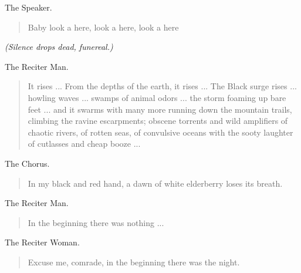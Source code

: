 \documentclass[letterpaper,article,12pt,oneside,notitlepage]{memoir}
\begin{document}
\begin{center}The Speaker.\end{center}

\begin{verse}
\hspace{1cm} Baby look a here, look a here, look a here \\
\end{verse}

\textit{(Silence drops dead, funereal.)}

\begin{center}The Reciter Man.\end{center}

\begin{verse}
\indent It rises ... From the depths of the earth, it rises ... The Black surge rises ... howling waves ... swamps of animal odors ... the storm foaming up bare feet ... and it swarms with many more running down the mountain trails, climbing the ravine escarpments; obscene torrents and wild amplifiers of chaotic rivers, of rotten seas, of convulsive oceans with the sooty laughter of cutlasses and cheap booze ... \\
\end{verse}

\begin{center}The Chorus.\end{center}

\begin{verse}
\hspace{1cm} In my black and red hand, a dawn of white elderberry loses its breath. \\
\end{verse}

\begin{center}The Reciter Man.\end{center}

\begin{verse}
\hspace{1cm} In the beginning there was nothing ... \\
\end{verse}

\begin{center}The Reciter Woman.\end{center}

\begin{verse}
\hspace{1cm} Excuse me, comrade, in the beginning there was the night. \\
\end{verse}
\end{document}
